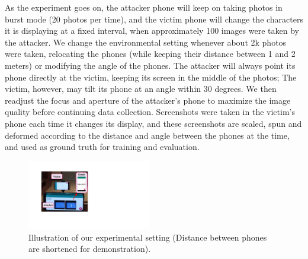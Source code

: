 As the experiment goes on, the attacker phone will keep on taking photos in burst mode (20 photos per time), and the victim phone will change the characters it is displaying at a fixed interval, when approximately 100 images were taken by the attacker. We change the environmental setting whenever about 2k photos were taken, relocating the phones (while keeping their distance between 1 and 2 meters) or modifying the angle of the phones. The attacker will always point its phone directly at the victim, keeping its screen in the middle of the photos; The victim, however, may tilt its phone at an angle within 30 degrees. We then readjust the focus and aperture of the attacker's phone to maximize the image quality before continuing data collection. Screenshots were taken in the victim's phone each time it changes its display, and these screenshots are scaled, spun and deformed according to the distance and angle between the phones at the time, and used as ground truth for training and evaluation.
\begin{figure}
	\centering
	\includegraphics[width=0.48\textwidth]{pic/setup.pdf}
    \caption{Illustration of our experimental setting (Distance between phones are shortened for demonstration).}
	\label{illustration_of_system}
\end{figure}

